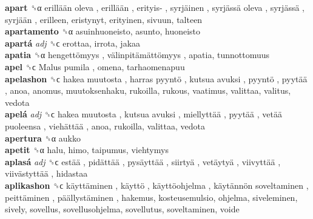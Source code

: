 \textbf{apart} ␝α   erillään oleva ,  erillään ,  erityis- ,  syrjäinen ,  syrjässä oleva ,  syrjässä ,  syrjään , erilleen, eristynyt, erityinen, sivuun, talteen  \\
\textbf{apartamento} ␝α  asuinhuoneisto, asunto, huoneisto  \\
\textbf{apartá} \emph{adj}  ␝ϲ  erottaa, irrota, jakaa  \\
\textbf{apatia} ␝α   hengettömyys ,  välinpitämättömyys , apatia, tunnottomuus  \\
\textbf{apel} ␝ϲ   Malus pumila , omena, tarhaomenapuu  \\
\textbf{apelashon} ␝ϲ   hakea muutosta ,  harras pyyntö ,  kutsua avuksi ,  pyyntö ,  pyytää , anoa, anomus, muutoksenhaku, rukoilla, rukous, vaatimus, valittaa, valitus, vedota  \\
\textbf{apelá} \emph{adj}  ␝ϲ   hakea muutosta ,  kutsua avuksi ,  miellyttää ,  pyytää ,  vetää puoleensa ,  viehättää , anoa, rukoilla, valittaa, vedota  \\
\textbf{apertura} ␝α  aukko  \\
\textbf{apetit} ␝α  halu, himo, taipumus, viehtymys  \\
\textbf{aplasá} \emph{adj}  ␝ϲ   estää ,  pidättää ,  pysäyttää ,  siirtyä ,  vetäytyä ,  viivyttää ,  viivästyttää , hidastaa  \\
\textbf{aplikashon} ␝ϲ   käyttäminen ,  käyttö ,  käyttöohjelma ,  käytännön soveltaminen ,  peittäminen ,  päällystäminen , hakemus, kosteusemulsio, ohjelma, siveleminen, sively, sovellus, sovellusohjelma, sovellutus, soveltaminen, voide  \\
